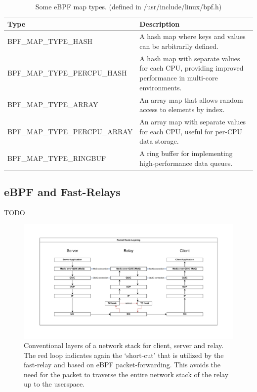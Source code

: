 \begin{table}[htbp]
    \centering
    \begin{tabular}{L{7cm}L{7cm}}
        \toprule
            Type & Description \\
        \midrule
            BPF\_MAP\_TYPE\_HASH & A hash map where keys and values can be arbitrarily defined. \\
        \midrule
            BPF\_MAP\_TYPE\_PERCPU\_HASH & A hash map with separate values for each CPU, providing improved performance in multi-core environments. \\
        \midrule
            BPF\_MAP\_TYPE\_ARRAY & An array map that allows random access to elements by index. \\
        \midrule
            BPF\_MAP\_TYPE\_PERCPU\_ARRAY & An array map with separate values for each CPU, useful for per-CPU data storage. \\
        \midrule
            BPF\_MAP\_TYPE\_RINGBUF & A ring buffer for implementing high-performance data queues. \\
        \bottomrule
    \end{tabular}
    \caption[TODO: add this to tables and figures for better naming]{Some eBPF map types. (defined in /usr/include/linux/bpf.h)}\label{tab:eBPF-map-types}
\end{table}

\subsection{eBPF and Fast-Relays}
TODO

\begin{figure}[htbp]
    \centering
    \includegraphics[width=\textwidth]{figures/02_background/route-layering.drawio.pdf}
    \caption{Conventional layers of a network stack for client, server and relay.
    The red loop indicates again the `short-cut' that is utilized by the fast-relay and 
    based on eBPF packet-forwarding.
    This avoids the need for the packet to traverse the entire network stack of the relay 
    up to the userspace.}\label{fig:route-layering}
\end{figure}
